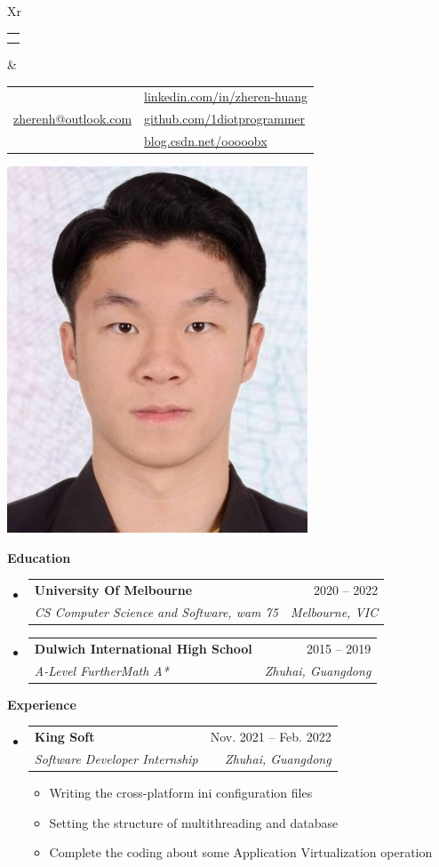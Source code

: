 \documentclass[letterpaper,12pt]{article}[leftmargin=*]
\makeatletter
\def \fullname {Zheren Huang}
\def \subtitle {}
\def \linkedinicon {\faLinkedin}
\def \linkedinlink {https://linkedin.com/in/zheren-huang-9133a6235/}
\def \linkedintext {linkedin.com/in/zheren-huang}
\def \phoneicon {\faPhone}
\def \phonetext {+61 466641756}
\def \emailicon {\faEnvelope}
\def \emaillink {mailto:zherenh@outlook.com}
\def \emailtext {zherenh@outlook.com}
\def \githubicon {\faGithub}
\def \githublink {https://github.com/1diotprogrammer}
\def \githubtext {github.com/1diotprogrammer}
\def \websiteicon {\faGlobe}
\def \websitelink {https://blog.csdn.net/ooooobx?spm=1000.2115.3001.5343}
\def \websitetext {blog.csdn.net/ooooobx}
\def \headertype {\doublecol}
\def \entryspacing {-0pt}
\def \linkedin {\linkedinicon \hspace{3pt}\href{\linkedinlink}{\linkedintext}}
\def \phone {\phoneicon \hspace{3pt}{ \phonetext}}
\def \email {\emailicon \hspace{3pt}\href{\emaillink}{\emailtext}}
\def \github {\githubicon \hspace{3pt}\href{\githublink}{\githubtext}}
\def \website {\websiteicon \hspace{3pt}\href{\websitelink}{\websitetext}}
\renewcommand{\section}[2]{\vspace{5pt}
  \colorbox{secondary}{\color{white}\raggedbottom\normalsize\textbf{{#1}{\hspace{7pt}#2}}}
}
\newcommand{\resumeEntryStart}{\begin{itemize}[leftmargin=2.5mm]}
\newcommand{\resumeEntryEnd}{\end{itemize}\vspace{\entryspacing}}
\newcommand{\resumeItemListStart}{\begin{itemize}[leftmargin=4.5mm]}
\newcommand{\resumeItemListEnd}{\end{itemize}}
\newcommand{\resumeItem}[1]{
  \item\small{
    {#1 \vspace{-2pt}}
  }
}
\newcommand{\resumeEntryTSDL}[4]{
  \vspace{-1pt}\item[]
    \begin{tabularx}{0.97\textwidth}{X@{\hspace{60pt}}r}
      \textbf{\color{primary}#1} & {\firabook\color{accent}\small#2} \\
      \textit{\color{accent}\small#3} & \textit{\color{accent}\small#4} \\
    \end{tabularx}\vspace{-6pt}
}
\newcommand{\doublecol}[6]{
  \begin{tabularx}{\textwidth}{Xr}
    {
      \begin{tabular}[c]{l}
        \fontsize{35}{45}\selectfont{\color{primary}{{\textbf{\fullname}}}} \\
        {\textit{\subtitle}} 
      \end{tabular}
    } & {
      \begin{tabular}[c]{l@{\hspace{1.5em}}l}
        {\small#4} & {\small#1} \\
        {\small#5} & {\small#2} \\
        {\small#6} & {\small#3}
      \end{tabular}
    }
  \end{tabularx}
}
\makeatother
\begin{document}
\headertype{\linkedin}{\github}{\website}{\phone}{\email}{} 
\vspace{-10pt}  

  \includegraphics[scale=0.4]{IDPhoto.jpg}

\section{\faGraduationCap}{Education}

  \resumeEntryStart
    \resumeEntryTSDL
      {University Of Melbourne}{2020 -- 2022}
      {CS Computer Science and Software, wam 75}{Melbourne, VIC}
  \resumeEntryEnd
  
  \resumeEntryStart
    \resumeEntryTSDL
      {Dulwich International High School}{2015 -- 2019}
      {A-Level FurtherMath A*}{Zhuhai, Guangdong}
  \resumeEntryEnd


\section{\faPieChart}{Experience}

  \resumeEntryStart
    \resumeEntryTSDL
      {King Soft}{Nov. 2021 -- Feb. 2022}
      {Software Developer Internship}{Zhuhai, Guangdong}
    \resumeItemListStart
      \resumeItem {Writing the cross-platform ini configuration files}
      \resumeItem {Setting the structure of multithreading and database}
      \resumeItem {Complete the coding about some Application Virtualization operation}
    \resumeItemListEnd
  \resumeEntryEnd
  
\end{document}
